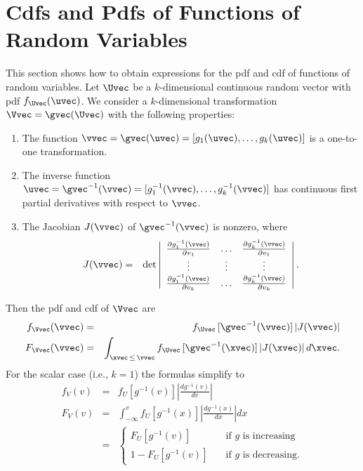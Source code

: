 \section{Cdfs and Pdfs of Functions of Random Variables}
\label{asection:transformation.of.rv}
This section shows how to obtain expressions for the
pdf and cdf of functions of random variables.
Let $\Uvec$ be a $k$-dimensional continuous
random vector with pdf $f_{\Uvec}(\uvec)$. We consider a 
$k$-dimensional transformation $\Vvec=\gvec(\Uvec)$
with the following properties:
\begin{enumerate}
\item 
The function $\vvec=\gvec(\uvec)=
[g_{1}(\uvec), \ldots, g_{k}(\uvec)]$
is a one-to-one transformation.
\item
The inverse function $\uvec=\gvec^{-1}(\vvec)=[g_{1}^{-1}(\vvec), \ldots, g_{k}^{-1}(\vvec)]$ has
continuous first partial derivatives with respect to $\vvec$.
\item
The Jacobian $J(\vvec)$ of $\gvec^{-1}(\vvec)$
is nonzero, where 
\begin{eqnarray*}
J(\vvec)&=&\det
\left |
\begin{array}{ccc}
\frac{ \partial g^{-1}_{1}(\vvec)}
     { \partial v_{1}} & \ldots & 
\frac{ \partial g^{-1}_{k}(\vvec)}
     { \partial v_{1}} 
\\
\vdots & \vdots & \vdots
\\
\frac{ \partial g^{-1}_{1}(\vvec)}
     { \partial v_{k}} & \ldots & 
\frac{ \partial g^{-1}_{k}(\vvec)}
     { \partial v_{k}} 
\end{array}
\right |.
\end{eqnarray*}
\end{enumerate}
Then the  pdf and cdf of $\Vvec$ are
\begin{eqnarray*}
f_{\Vvec}(\vvec)&=& f_{\Uvec}\,[\gvec^{-1}(\vvec)]
 \left | J(\vvec) \right |
\\
F_{\Vvec}(\vvec)&=& 
\int_{\xvec \, \le \, \vvec}
f_{\Uvec}\,[\gvec^{-1}(\xvec)] \left | J(\xvec) \right |
d \xvec.
\end{eqnarray*}
For the scalar case (i.e., $k=1$) the formulas
simplify to 
\begin{eqnarray*}
f_{V}(v)&=& f_{U}[g^{-1}(v)] \left | \frac{
 		d g^{-1}(v)
			       }
	                       {
		d v
			       } \right |
\\
F_{V}(v)&=& 
\int_{-\infty}^{v}
f_{U}[g^{-1}(x)] \left | \frac{
 		d g^{-1}(x)
			       }
	                       {
		d x
			       } \right |
d x
\\
&=&
\left \{
\begin{array}{lc}
F_{U} \left [ 
   g^{-1}(v)
      \right ]
& \quad  \mbox{if $g$ is increasing}
\\[.5ex]
1-F_{U} \left [ 
   g^{-1}(v)
      \right ]
& \quad  \mbox{if $g$ is decreasing}.
\end{array}
\right.
\end{eqnarray*}
